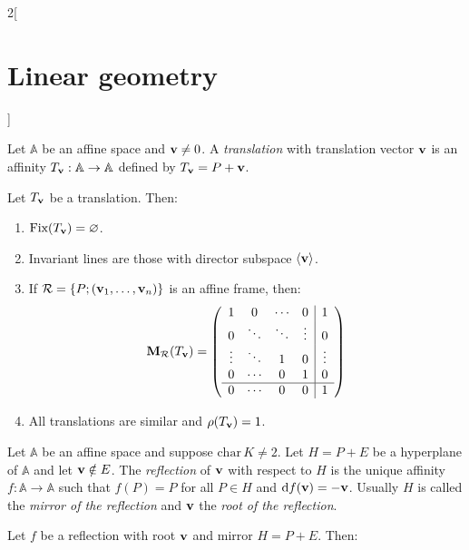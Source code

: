 \documentclass[../../../main.tex]{subfiles}
\begin{document}
\begin{multicols}{2}[\section{Linear geometry}]
\begin{definition}
  \end{definition}
  \begin{definition}[Translations]
    Let $\mathbb{A}$ be an affine space and $\boldsymbol{\mathrm{v}}\ne 0$. A \emph{translation} with translation vector $\boldsymbol{\mathrm{v}}$ is an affinity $T_{\boldsymbol{\mathrm{v}}}:\mathbb{A}\rightarrow\mathbb{A}$ defined by $T_{\boldsymbol{\mathrm{v}}}=P+\boldsymbol{\mathrm{v}}$.
  \end{definition}
  \begin{proposition}
    Let $T_{\boldsymbol{\mathrm{v}}}$ be a translation. Then:
    \begin{enumerate}
      \item $\text{Fix}(T_{\boldsymbol{\mathrm{v}}})=\varnothing$.
      \item Invariant lines are those with director subspace $\langle\boldsymbol{\mathrm{v}}\rangle$.
      \item If $\mathcal{R}=\{P;(\boldsymbol{\mathrm{v}}_1,\ldots,\boldsymbol{\mathrm{v}}_n)\}$ is an affine frame, then: $$\boldsymbol{\mathrm{M}}_\mathcal{R}(T_{\boldsymbol{\mathrm{v}}})=\left(\begin{array}{cccc|c}
                  1      & 0      & \cdots & 0      & 1      \\
                  0      & \ddots & \ddots & \vdots & 0      \\
                  \vdots & \ddots & 1      & 0      & \vdots \\
                  0      & \cdots & 0      & 1      & 0      \\
                  \hline
                  0      & \cdots & 0      & 0      & 1
                \end{array}\right)$$
      \item All translations are similar and $\rho(T_{\boldsymbol{\mathrm{v}}})=1$.
    \end{enumerate}
  \end{proposition}
  \begin{definition}[Reflections]
    Let $\mathbb{A}$ be an affine space and suppose $\text{char}\,K\ne 2$. Let $H=P+E$ be a hyperplane of $\mathbb{A}$ and let $\boldsymbol{\mathrm{v}}\notin E$. The \emph{reflection} of $\boldsymbol{\mathrm{v}}$ with respect to $H$ is the unique affinity $f:\mathbb{A}\rightarrow\mathbb{A}$ such that $f(P)=P$ for all $P\in H$ and $\dd{f(\boldsymbol{\mathrm{v}})}=-\boldsymbol{\mathrm{v}}$. Usually $H$ is called the \emph{mirror of the reflection} and $\boldsymbol{\mathrm{v}}$ the \emph{root of the reflection}.
  \end{definition}
  \begin{proposition}
    Let $f$ be a reflection with root $\boldsymbol{\mathrm{v}}$ and mirror $H=P+E$. Then:
    \begin{enumerate}

\end{enumerate}
\end{proposition}
\end{multicols}
\end{document}
